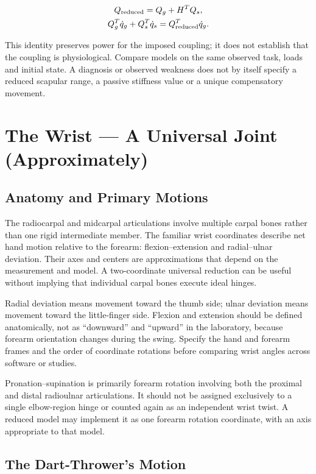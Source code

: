 \[
\begin{gathered}Q_{\rm reduced}=Q_g+H^T Q_s,\\ Q_g^T\dot q_g+Q_s^T\dot q_s=Q_{\rm reduced}^T\dot q_g.\end{gathered}
\]

This identity preserves power for the imposed coupling; it does not establish that the coupling is physiological. Compare models on the same observed task, loads and initial state. A diagnosis or observed weakness does not by itself specify a reduced scapular range, a passive stiffness value or a unique compensatory movement.

\section{The Wrist --- A Universal Joint (Approximately)}\label{sec-wrist_joint}\label{sec:wrist_joint}

\subsection{Anatomy and Primary Motions}\label{anatomy-and-primary-motions}

The radiocarpal and midcarpal articulations involve multiple carpal bones rather than one rigid intermediate member. The familiar wrist coordinates describe net hand motion relative to the forearm: flexion--extension and radial--ulnar deviation. Their axes and centers are approximations that depend on the measurement and model. A two-coordinate universal reduction can be useful without implying that individual carpal bones execute ideal hinges.

Radial deviation means movement toward the thumb side; ulnar deviation means movement toward the little-finger side. Flexion and extension should be defined anatomically, not as ``downward'' and ``upward'' in the laboratory, because forearm orientation changes during the swing. Specify the hand and forearm frames and the order of coordinate rotations before comparing wrist angles across software or studies.

Pronation--supination is primarily forearm rotation involving both the proximal and distal radioulnar articulations. It should not be assigned exclusively to a single elbow-region hinge or counted again as an independent wrist twist. A reduced model may implement it as one forearm rotation coordinate, with an axis appropriate to that model.

\subsection{The Dart-Thrower's Motion}\label{the-dart-throwers-motion}

